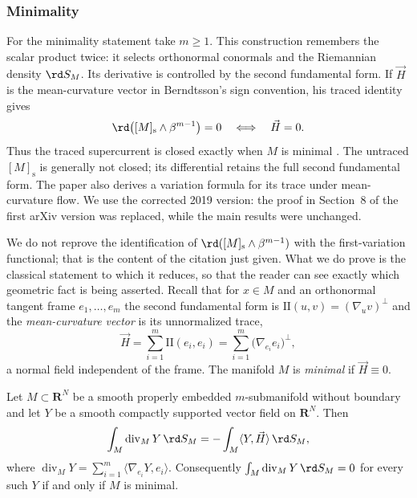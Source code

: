 \subsubsection{Minimality}

For the minimality statement take $m\ge1$. This construction remembers
the scalar product twice: it selects
orthonormal conormals and the Riemannian density $\rd S_M$.  Its derivative is
controlled by the second fundamental form.  If $\vec H$ is the mean-curvature
vector in Berndtsson's sign convention, his traced identity gives
\[
       \rd\bigl([M]_{\mathrm s}\wedge\beta^{m-1}\bigr)=0
       \quad\Longleftrightarrow\quad \vec H=0.
\]
Thus the traced supercurrent is closed exactly when $M$ is minimal
\cite[Corollary~5.2]{Ber19Super}.  The untraced $[M]_{\mathrm s}$ is generally
not closed; its differential retains the full second fundamental form.  The
paper also derives a variation formula for its trace under mean-curvature
flow.  We use the corrected 2019 version: the proof in Section~8 of the first
arXiv version was replaced, while the main results were unchanged.

We do not reprove the identification of $\rd([M]_{\mathrm s}\wedge\beta^{m-1})$
with the first-variation functional; that is the content of the citation just
given.  What we do prove is the classical statement to which it reduces, so
that the reader can see exactly which geometric fact is being asserted.
Recall that for $x\in M$ and an orthonormal tangent frame
$e_1,\ldots,e_m$ the second fundamental form is
$\mathrm{II}(u,v)=(\nabla_uv)^{\perp}$ and the \emph{mean-curvature vector}
is its unnormalized trace,
\[
 \vec H=\sum_{i=1}^m\mathrm{II}(e_i,e_i)
 =\sum_{i=1}^m\bigl(\nabla_{e_i}e_i\bigr)^{\perp},
\]
a normal field independent of the frame.  The manifold $M$ is \emph{minimal}
if $\vec H\equiv0$.

\begin{proposition}
\label{prop:ch14-first-variation}
Let $M\subset\mathbf R^N$ be a smooth properly embedded $m$-submanifold
without boundary and let $Y$ be a smooth compactly supported vector field on
$\mathbf R^N$.  Then
\[
 \int_M\operatorname{div}_MY\,\rd S_M
 =-\int_M\langle Y,\vec H\rangle\,\rd S_M ,
\]
where $\operatorname{div}_MY=\sum_{i=1}^m\langle\nabla_{e_i}Y,e_i\rangle$.
Consequently $\int_M\operatorname{div}_MY\,\rd S_M=0$ for every such $Y$ if
and only if $M$ is minimal.
\end{proposition}

